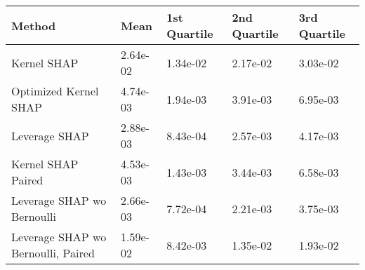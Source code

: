 \begin{tabular}{lllll}
  \toprule
  \textbf{Method} & \textbf{Mean} & \textbf{1st Quartile} & \textbf{2nd Quartile} & \textbf{3rd Quartile} \\ \midrule 
Kernel SHAP & 2.64e-02 & 1.34e-02 & 2.17e-02 & 3.03e-02\\
Optimized Kernel SHAP & 4.74e-03 & 1.94e-03 & 3.91e-03 & 6.95e-03\\
Leverage SHAP & \cellcolor{silver!60}2.88e-03 & \cellcolor{silver!60}8.43e-04 & \cellcolor{silver!60}2.57e-03 & \cellcolor{silver!60}4.17e-03\\
Kernel SHAP Paired & \cellcolor{bronze!60}4.53e-03 & \cellcolor{bronze!60}1.43e-03 & \cellcolor{bronze!60}3.44e-03 & \cellcolor{bronze!60}6.58e-03\\
Leverage SHAP wo Bernoulli & \cellcolor{gold!60}2.66e-03 & \cellcolor{gold!60}7.72e-04 & \cellcolor{gold!60}2.21e-03 & \cellcolor{gold!60}3.75e-03\\
Leverage SHAP wo Bernoulli, Paired & 1.59e-02 & 8.42e-03 & 1.35e-02 & 1.93e-02\\
\bottomrule
\end{tabular}